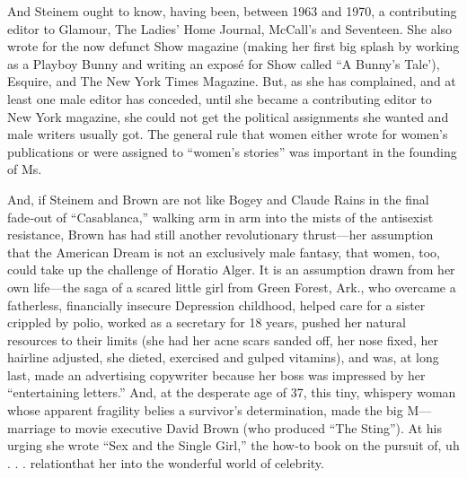 And Steinem ought to know, having been, between 1963 and 1970, a
contributing editor to Glamour, The Ladies' Home Journal, McCall's and
Seventeen. She also wrote for the now defunct Show magazine (making her
first big splash by working as a Playboy Bunny and writing an exposé for
Show called ``A Bunny's Tale'), Esquire, and The New York Times
Magazine. But, as she has complained, and at least one male editor has
conceded, until she became a contributing editor to New York magazine,
she could not get the political assignments she wanted and male writers
usually got. The general rule that women either wrote for women's
publications or were assigned to ``women's stories'' was important in
the founding of Ms.

And, if Steinem and Brown are not like Bogey and Claude Rains in the
final fade‐out of ``Casablanca,'' walking arm in arm into the mists of
the antisexist resistance, Brown has had still another revolutionary
thrust---her assumption that the American Dream is not an exclusively
male fantasy, that women, too, could take up the challenge of Horatio
Alger. It is an assumption drawn from her own life---the saga of a
scared little girl from Green Forest, Ark., who overcame a fatherless,
financially insecure Depression childhood, helped care for a sister
crippled by polio, worked as a secretary for 18 years, pushed her
natural resources to their limits (she had her acne scars sanded off,
her nose fixed, her hairline adjusted, she dieted, exercised and gulped
vitamins), and was, at long last, made an advertising copywriter because
her boss was impressed by her ``entertaining letters.'' And, at the
desperate age of 37, this tiny, whispery woman whose apparent fragility
belies a survivor's determination, made the big M---marriage to movie
executive David Brown (who produced ``The Sting''). At his urging she
wrote ``Sex and the Single Girl,'' the how‐to book on the pursuit of, uh
. . . relationthat her into the wonderful world of celebrity.

